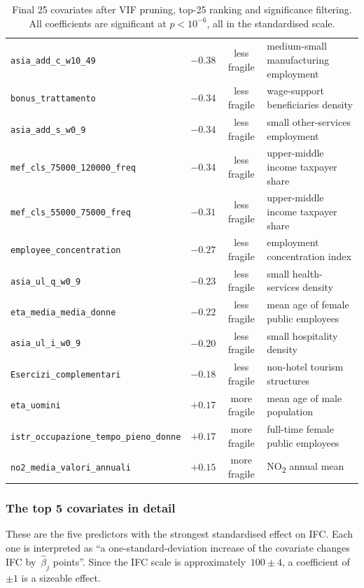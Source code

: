 \documentclass[11pt,a4paper]{article}
\begin{document}
\begin{table}[h!]
\begin{tabular}{l c c l}
    \texttt{asia\_add\_c\_w10\_49}      & $-0.38$ & less fragile & medium-small manufacturing employment\\
    \texttt{bonus\_trattamento}         & $-0.34$ & less fragile & wage-support beneficiaries density\\
    \texttt{asia\_add\_s\_w0\_9}        & $-0.34$ & less fragile & small other-services employment\\
    \texttt{mef\_cls\_75000\_120000\_freq} & $-0.34$ & less fragile & upper-middle income taxpayer share\\
    \texttt{mef\_cls\_55000\_75000\_freq}  & $-0.31$ & less fragile & upper-middle income taxpayer share\\
    \texttt{employee\_concentration}    & $-0.27$ & less fragile & employment concentration index\\
    \texttt{asia\_ul\_q\_w0\_9}         & $-0.23$ & less fragile & small health-services density\\
    \texttt{eta\_media\_media\_donne}   & $-0.22$ & less fragile & mean age of female public employees\\
    \texttt{asia\_ul\_i\_w0\_9}         & $-0.20$ & less fragile & small hospitality density\\
    \texttt{Esercizi\_complementari}    & $-0.18$ & less fragile & non-hotel tourism structures\\
    \texttt{eta\_uomini}                & $+0.17$ & more fragile & mean age of male population\\
    \texttt{istr\_occupazione\_tempo\_pieno\_donne} & $+0.17$ & more fragile & full-time female public employees\\
    \texttt{no2\_media\_valori\_annuali}            & $+0.15$ & more fragile & NO\textsubscript{2} annual mean\\
    \bottomrule
  \end{tabular}
  \caption{Final 25 covariates after VIF pruning, top-25 ranking and
    significance filtering. All coefficients are significant at
    $p < 10^{-6}$, all in the standardised scale.}
  \label{tab:final25}
\end{table}

\subsubsection*{The top 5 covariates in detail}

These are the five predictors with the strongest standardised effect
on IFC. Each one is interpreted as ``a one-standard-deviation
increase of the covariate changes IFC by~$\hat\beta_j$ points''.
Since the IFC scale is approximately~$100 \pm 4$, a coefficient of
$\pm 1$ is a sizeable effect.
\end{document}
